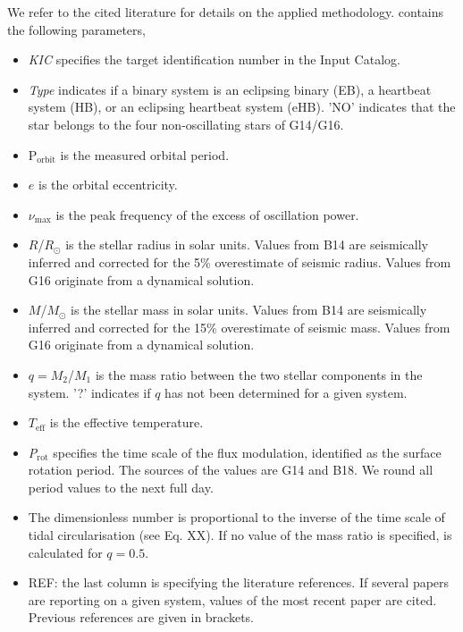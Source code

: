 We refer to the cited literature for details on the applied methodology.
 contains the following parameters,
\begin{itemize}
\item \textit{KIC} specifies the target identification number in the \Kepler Input Catalog.
\item  \textit{Type} indicates if a binary system is an eclipsing binary (EB), a heartbeat system (HB), or an eclipsing heartbeat system (eHB).	'NO' indicates that the star belongs to the four non-oscillating stars of G14/G16.
\item  P$_{\mathrm{orbit}}$ is the measured orbital period.	
\item  $e$ is the orbital eccentricity.
\item  $\nu_{\mathrm{max}}$ is the peak frequency of the excess of oscillation power.
\item  $R$/$R_{\odot}$ is the stellar radius in solar units. Values from B14 are seismically inferred and corrected for the 5\% overestimate of seismic radius. Values from G16 originate from a dynamical solution.
\item  $M$/$M_{\odot}$ is the stellar mass in solar units. Values from B14 are seismically inferred and corrected for the 15\% overestimate of  seismic mass. Values from G16 originate from a dynamical solution.		
\item  {$q=M_2$/$M_1$} is the mass ratio between the two stellar components in the system. '?' indicates if $q$ has not been determined for a given system. 
\item  $T_{\mathrm{eff}}$ is the effective temperature. 
\item  \textit{P$_{\mathrm{rot}}$} specifies the time scale of the flux modulation, identified as the surface rotation period. The sources of the values are G14 and B18. We round all period values to the next full day.
\item  The dimensionless number \textit{\varR} is proportional to the inverse of the time scale of tidal circularisation (see Eq. XX). If no value of the mass ratio is specified, \varR is calculated for $q=0.5$.
\item REF: the last column is specifying the literature references. If several papers are reporting on a given system, values of the most recent paper are cited. Previous references are given in brackets.
\end{itemize}


